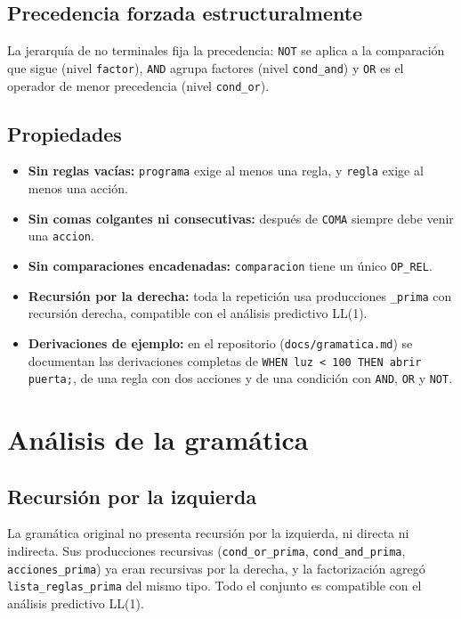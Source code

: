 \documentclass[12pt,a4paper]{article}
\begin{document}
\subsection{Precedencia forzada estructuralmente}
La jerarquía de no terminales fija la precedencia: \texttt{NOT} se aplica a
la comparación que sigue (nivel \texttt{factor}), \texttt{AND} agrupa
factores (nivel \texttt{cond\_and}) y \texttt{OR} es el operador de menor
precedencia (nivel \texttt{cond\_or}).

\subsection{Propiedades}
\begin{itemize}
  \item \textbf{Sin reglas vacías:} \texttt{programa} exige al menos una
        regla, y \texttt{regla} exige al menos una acción.
  \item \textbf{Sin comas colgantes ni consecutivas:} después de
        \texttt{COMA} siempre debe venir una \texttt{accion}.
  \item \textbf{Sin comparaciones encadenadas:} \texttt{comparacion} tiene
        un único \texttt{OP\_REL}.
  \item \textbf{Recursión por la derecha:} toda la repetición usa
        producciones \texttt{\_prima} con recursión derecha, compatible con
        el análisis predictivo LL(1).
  \item \textbf{Derivaciones de ejemplo:} en el repositorio
        (\texttt{docs/gramatica.md}) se documentan las derivaciones completas
        de \texttt{WHEN luz < 100 THEN abrir puerta;}, de una regla con dos
        acciones y de una condición con \texttt{AND}, \texttt{OR} y
        \texttt{NOT}.
\end{itemize}

\section{Análisis de la gramática}

\subsection{Recursión por la izquierda}
La gramática original no presenta recursión por la izquierda, ni directa ni
indirecta. Sus producciones recursivas (\texttt{cond\_or\_prima},
\texttt{cond\_and\_prima}, \texttt{acciones\_prima}) ya eran recursivas por
la derecha, y la factorización agregó \texttt{lista\_reglas\_prima} del mismo
tipo. Todo el conjunto es compatible con el análisis predictivo LL(1).
\end{document}
